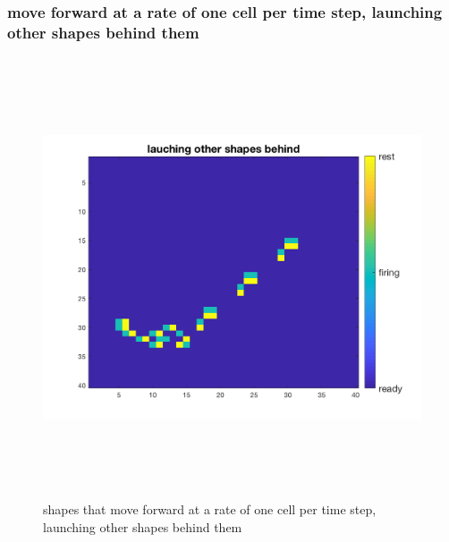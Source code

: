 \documentclass[12pt]{article}
\begin{document}
\subsubsection{move forward at a rate of one cell per time step, launching other shapes behind them}
\begin{figure}[H] %
\centering
\includegraphics[width = 16 cm, height = 13cm]{task2_2.png}
\caption{shapes that move forward at a rate of one cell per time step, launching other shapes behind them}
\label{fig:task2_2}
\end{figure}
\end{document}
